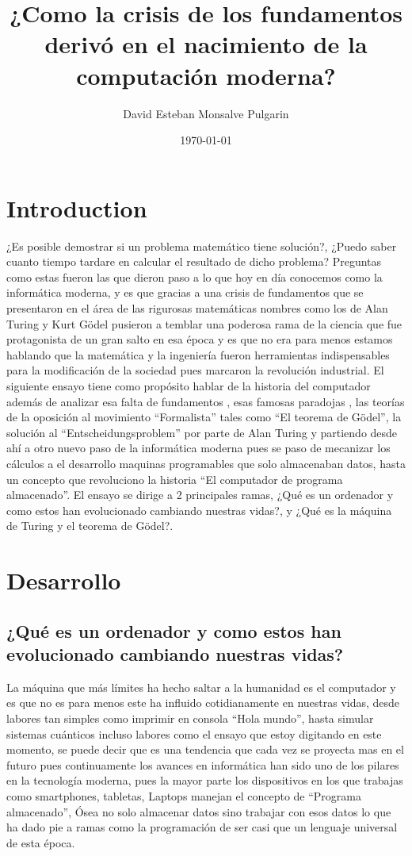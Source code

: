 \documentclass{article}
\title{¿Como la crisis de los fundamentos derivó en el nacimiento de la computación moderna?}
\author{David Esteban Monsalve Pulgarin}
\date{\today}
\begin{document}
\maketitle

\section{Introduction}

¿Es posible demostrar si un problema matemático tiene solución?, ¿Puedo saber cuanto tiempo tardare en calcular el resultado de dicho problema? Preguntas como estas fueron las que dieron paso a lo que hoy en día conocemos como la informática moderna, y es que gracias a una crisis de fundamentos que se presentaron en el área de las rigurosas matemáticas nombres como los de Alan Turing y Kurt Gödel pusieron a temblar una poderosa rama de la ciencia que fue protagonista de un gran salto en esa época y es que no era para menos estamos hablando que la matemática y la ingeniería fueron herramientas indispensables para la modificación de la sociedad pues marcaron la revolución industrial. 
El siguiente ensayo tiene como propósito hablar de la historia del computador además de  analizar esa falta de fundamentos , esas famosas paradojas , las teorías de la oposición al movimiento “Formalista” tales como “El teorema de Gödel”, la solución al “Entscheidungsproblem” por parte de Alan Turing y partiendo desde ahí a otro nuevo paso de la informática moderna pues se paso de mecanizar los cálculos a el desarrollo maquinas programables que solo almacenaban datos, hasta un concepto que revoluciono la historia “El computador de programa almacenado”. El ensayo se dirige a 2 principales ramas, ¿Qué es un ordenador y como estos han evolucionado cambiando nuestras vidas?, y ¿Qué es la máquina de Turing y el teorema de Gödel?.


\section{Desarrollo}
\subsection{¿Qué es un ordenador y como estos han evolucionado cambiando nuestras vidas?}

\par 
\vspace{2mm}
La máquina que más límites ha hecho saltar a la humanidad es el computador y es que no es para menos este ha influido  cotidianamente en nuestras vidas, desde labores tan simples como imprimir en consola “Hola mundo”, hasta simular sistemas cuánticos incluso labores como el ensayo que estoy digitando en este momento, se puede decir que es una tendencia que cada vez se proyecta mas en el futuro pues continuamente los avances en informática han sido uno de los pilares en la tecnología moderna, pues la mayor parte los dispositivos en los que trabajas como smartphones, tabletas, Laptops manejan el concepto de “Programa almacenado”, Ósea no solo almacenar datos sino trabajar con esos datos lo que ha dado pie a ramas como la programación de ser casi que un lenguaje universal de esta época.
\end{document}
